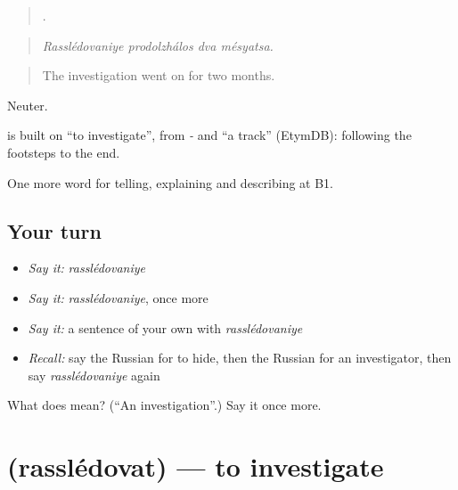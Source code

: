 \begin{quote}
   .
\end{quote}

\begin{quote}
\emph{Rasslédovaniye prodolzhálos dva mésyatsa.}
\end{quote}

\begin{quote}
The investigation went on for two months.
\end{quote}

Neuter.

\begin{cousinweb}
\emph{} is built on \emph{} \textquotedblleft{}to investigate\textquotedblright{}, from \emph{-} and \emph{} \textquotedblleft{}a track\textquotedblright{} (EtymDB): following the footsteps to the end.
\end{cousinweb}

\begin{grammarlens}[title={What you've built}]
One more word for telling, explaining and describing at B1.
\end{grammarlens}

\subsection*{Your turn}
\begin{itemize}
\raggedright
  \item \emph{Say it:} \emph{rasslédovaniye}
  \item \emph{Say it:} \emph{rasslédovaniye}, once more
  \item \emph{Say it:} a sentence of your own with \emph{rasslédovaniye}
  \item \emph{Recall:} say the Russian for to hide, then the Russian for an investigator, then say \emph{rasslédovaniye} again
\end{itemize}

\begin{tcolorbox}[breakable,colback=teal!4,colframe=teal!35!black,title={Before you move on}]
What does  mean? (\textquotedblleft{}An investigation\textquotedblright{}.) Say it once more.
\end{tcolorbox}
\section[\texorpdfstring{\ru{расследовать} (rasslédovat)}{расследовать (rasslédovat)}]{ (rasslédovat) — to investigate}

